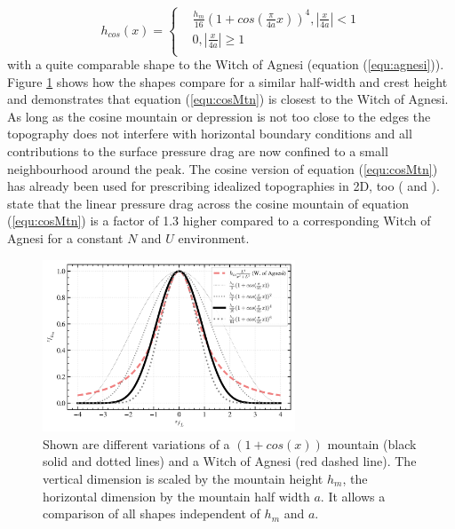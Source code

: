 \begin{equation}
    h_{cos}(x) = 
    \begin{cases}
        & \frac{h_m}{16} (1+cos(\frac{\pi}{4a}x))^4, |\frac{x}{4a}| < 1 \\
        & 0, |\frac{x}{4a}| \geq 1 \\
      \end{cases}
    \label{equ:cosMtn}
\end{equation}
with a quite comparable shape to the Witch of Agnesi (equation (\ref{equ:agnesi})). Figure \ref{fig:topo_trans} shows how the shapes compare for a similar half-width and crest height and demonstrates that equation (\ref{equ:cosMtn}) is closest to the Witch of Agnesi. As long as the cosine mountain or depression is not too close to the edges the topography does not interfere with horizontal boundary conditions and all contributions to the surface pressure drag are now confined to a small neighbourhood around the peak. The cosine version of equation (\ref{equ:cosMtn}) has already been used for prescribing idealized topographies in 2D, too (\cite[]{epifanio_three-dimensional_2001} and \cite[]{metz_are_2021}). \textcite{metz_are_2021} state that the linear pressure drag across the cosine mountain of equation (\ref{equ:cosMtn}) is a factor of 1.3 higher compared to a corresponding Witch of Agnesi for a constant $N$ and $U$ environment.
\begin{figure}[t]
    \centering
    \includegraphics[width=0.67\textwidth]{figures_model/topo-transient-boundary.png}
    \caption{Shown are different variations of a $(1+cos(x))$ mountain (black solid and dotted lines) and a Witch of Agnesi (red dashed line). The vertical dimension is scaled by the mountain height $h_m$, the horizontal dimension by the mountain half width $a$. It allows a comparison of all shapes independent of $h_m$ and $a$.}
    \label{fig:topo_trans}
\end{figure} 

